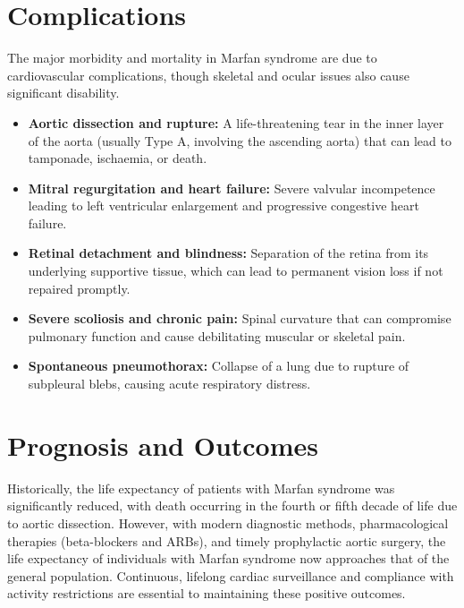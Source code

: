 \section*{Complications}
The major morbidity and mortality in Marfan syndrome are due to cardiovascular complications, though skeletal and ocular issues also cause significant disability.
\begin{itemize}
    \item \textbf{Aortic dissection and rupture:} A life-threatening tear in the inner layer of the aorta (usually Type A, involving the ascending aorta) that can lead to tamponade, ischaemia, or death.
    \item \textbf{Mitral regurgitation and heart failure:} Severe valvular incompetence leading to left ventricular enlargement and progressive congestive heart failure.
    \item \textbf{Retinal detachment and blindness:} Separation of the retina from its underlying supportive tissue, which can lead to permanent vision loss if not repaired promptly.
    \item \textbf{Severe scoliosis and chronic pain:} Spinal curvature that can compromise pulmonary function and cause debilitating muscular or skeletal pain.
    \item \textbf{Spontaneous pneumothorax:} Collapse of a lung due to rupture of subpleural blebs, causing acute respiratory distress.
\end{itemize}

\section*{Prognosis and Outcomes}
Historically, the life expectancy of patients with Marfan syndrome was significantly reduced, with death occurring in the fourth or fifth decade of life due to aortic dissection. However, with modern diagnostic methods, pharmacological therapies (beta-blockers and ARBs), and timely prophylactic aortic surgery, the life expectancy of individuals with Marfan syndrome now approaches that of the general population. Continuous, lifelong cardiac surveillance and compliance with activity restrictions are essential to maintaining these positive outcomes.

